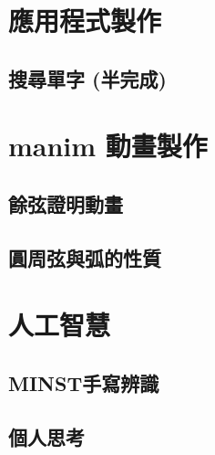 \documentclass[12pt]{ctexart}
\begin{document}
\clearpage
\section{ 應用程式製作 }
\label{ sec::app }
\subsection{ 搜尋單字 (半完成) }


\clearpage
\section{ manim 動畫製作 }
\label{ sec::animate }
\subsection{ 餘弦證明動畫 }
\clearpage
\subsection{ 圓周弦與弧的性質 }



\clearpage
\section{ 人工智慧 }
\label{ sec::AI }
\subsection{ MINST手寫辨識 }
\clearpage
\subsection{ 個人思考 }
\end{document}
